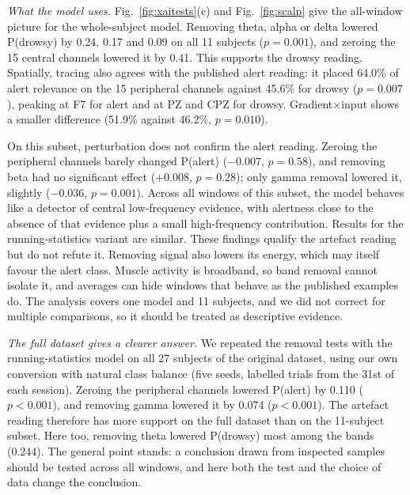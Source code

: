 \textit{What the model uses.} Fig.~\ref{fig:xaitests}(c) and Fig.~\ref{fig:scalp} give the all-window picture for the whole-subject model. Removing theta, alpha or delta lowered P(drowsy) by 0.24, 0.17 and 0.09 on all 11 subjects ($p = 0.001$), and zeroing the 15 central channels lowered it by 0.41. This supports the drowsy reading. Spatially, tracing also agrees with the published alert reading: it placed 64.0\% of alert relevance on the 15 peripheral channels against 45.6\% for drowsy ($p = 0.007$), peaking at F7 for alert and at PZ and CPZ for drowsy. Gradient$\times$input shows a smaller difference (51.9\% against 46.2\%, $p = 0.010$).

On this subset, perturbation does not confirm the alert reading. Zeroing the peripheral channels barely changed P(alert) ($-0.007$, $p = 0.58$), and removing beta had no significant effect ($+0.008$, $p = 0.28$); only gamma removal lowered it, slightly ($-0.036$, $p = 0.001$). Across all windows of this subset, the model behaves like a detector of central low-frequency evidence, with alertness close to the absence of that evidence plus a small high-frequency contribution. Results for the running-statistics variant are similar. These findings qualify the artefact reading but do not refute it. Removing signal also lowers its energy, which may itself favour the alert class. Muscle activity is broadband, so band removal cannot isolate it, and averages can hide windows that behave as the published examples do. The analysis covers one model and 11 subjects, and we did not correct for multiple comparisons, so it should be treated as descriptive evidence.

\textit{The full dataset gives a clearer answer.} We repeated the removal tests with the running-statistics model on all 27 subjects of the original dataset, using our own conversion with natural class balance (five seeds, labelled trials from the 31st of each session). Zeroing the peripheral channels lowered P(alert) by 0.110 ($p < 0.001$), and removing gamma lowered it by 0.074 ($p < 0.001$). The artefact reading therefore has more support on the full dataset than on the 11-subject subset. Here too, removing theta lowered P(drowsy) most among the bands (0.244). The general point stands: a conclusion drawn from inspected samples should be tested across all windows, and here both the test and the choice of data change the conclusion.

